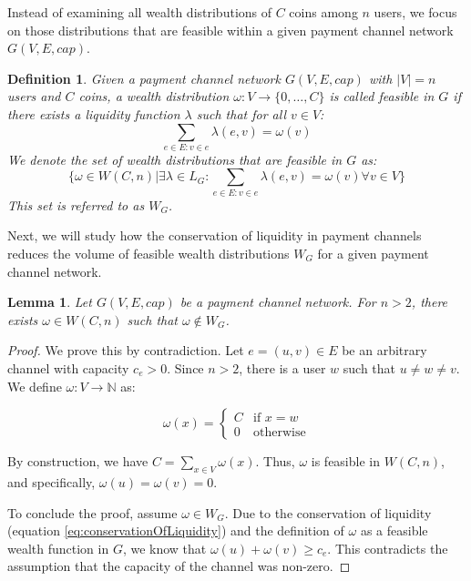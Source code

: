 \documentclass[10pt,twocolumn]{article}
\newtheorem{definition}{Definition}[section]
\newtheorem{lemma}[theorem]{Lemma}
\begin{document}
Instead of examining all wealth distributions of \( C \) coins among \( n \) users, we focus on those distributions that are feasible within a given payment channel network \( G(V,E,cap) \).

\begin{definition}
Given a payment channel network \( G(V,E,cap) \) with \( |V|=n \) users and \( C \) coins, a wealth distribution \( \omega: V \longrightarrow \{0,\dots,C\} \) is called feasible in \( G \) if there exists a liquidity function \( \lambda \) such that for all \( v \in V \):
\begin{equation}
\sum_{e \in E: v \in e} \lambda(e,v) = \omega(v)
\end{equation}
We denote the set of wealth distributions that are feasible in \( G \) as:
$$\{\omega \in W(C,n) | \exists \lambda \in L_G: \sum_{e \in E: v \in e} \lambda(e,v) = \omega(v) \forall v \in V\}$$
This set is referred to as \( W_G \).
\end{definition}

Next, we will study how the conservation of liquidity in payment channels reduces the volume of feasible wealth distributions \( W_G \) for a given payment channel network.

\begin{lemma}
\label{lem:subset}
Let \( G(V,E,cap) \) be a payment channel network. For \( n > 2 \), there exists \( \omega \in W(C,n) \) such that \( \omega \notin W_G \).
\end{lemma}

\begin{proof}
We prove this by contradiction. Let \( e = (u,v) \in E \) be an arbitrary channel with capacity \( c_e > 0 \). Since \( n > 2 \), there is a user \( w \) such that \( u \neq w \neq v \). We define \( \omega: V \longrightarrow \mathbb{N} \) as:

\begin{equation}
\omega(x) = \begin{cases}
C & \text{if } x = w \\
0 & \text{otherwise}
\end{cases}
\end{equation}

By construction, we have \( C = \sum_{x \in V} \omega(x) \). Thus, \( \omega \) is feasible in \( W(C,n) \), and specifically, \( \omega(u) = \omega(v) = 0 \).

To conclude the proof, assume \( \omega \in W_G \). Due to the conservation of liquidity (equation \ref{eq:conservationOfLiquidity}) and the definition of \( \omega \) as a feasible wealth function in \( G \), we know that \( \omega(u) + \omega(v) \geq c_e \). This contradicts the assumption that the capacity of the channel was non-zero.
\end{proof}
\end{document}
